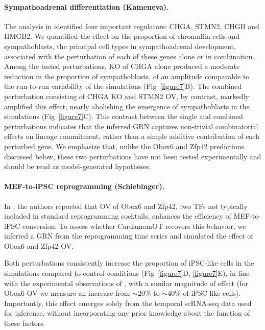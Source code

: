 \documentclass[a4paper, 11pt]{article}
\theoremstyle{plain}
\theoremstyle{remark}
\newcommand*{\firstreview}[1]{{\color{black}#1}}
\begin{document}
\paragraph{Sympathoadrenal differentiation (Kameneva).}  
The analysis in \cite{gandrillon2025inferring} identified four important regulators: {CHGA}, {STMN2}, {CHGB} and {HMGB2}. We quantified the effect on the proportion of chromaffin cells and sympathoblasts, the principal cell types in sympathoadrenal development, associated with the perturbation of each of these genes alone or in combination. Among the tested perturbations, KO of CHGA alone produced a moderate reduction in the proportion of sympathoblasts, of an amplitude comparable to the run-to-run variability of the simulations (Fig~\ref{figure7}B). The combined perturbation consisting of CHGA KO and STMN2 OV, by contrast, markedly amplified this effect, nearly abolishing the emergence of sympathoblasts in the simulations (Fig~\ref{figure7}C). This contrast between the single and combined perturbations indicates that the inferred GRN captures non-trivial combinatorial effects on lineage commitment, rather than a simple additive contribution of each perturbed gene. We emphasize that, unlike the Obox6 and Zfp42 predictions discussed below, these two perturbations have not been tested experimentally and should be read as model-generated hypotheses.

\paragraph{MEF-to-iPSC reprogramming (Schiebinger).}  
In \cite{schiebinger2019optimal}, the authors reported that OV of {Obox6} and {Zfp42}, 
two \firstreview{TFs} not typically included in standard reprogramming cocktails, 
enhances the efficiency of MEF-to-iPSC conversion. To assess whether CardamomOT 
recovers this behavior, we inferred a GRN from the reprogramming time series and 
simulated the effect of {Obox6} and {Zfp42} OV.

Both perturbations consistently increase the proportion of iPSC-like cells \firstreview{in the simulations} compared 
to control conditions (Fig~\ref{figure7}D, \ref{figure7}E), in line with the experimental 
observations of \cite{schiebinger2019optimal}, with a similar magnitude of 
effect (for {Obox6} OV we measure an increase from $\sim 20\%$ to $\sim 40\%$ of iPSC-like cells). Importantly, this effect emerges solely from the temporal scRNA-seq data 
used for inference, without incorporating any prior knowledge about the function 
of these factors.
\end{document}
